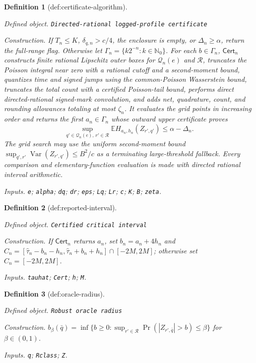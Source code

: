 \documentclass{article}
\newtheorem{definition}{Definition}
\begin{document}
\begin{definition}[def:certificate-algorithm]\label{def:certificate-algorithm}
\par\smallskip\noindent\emph{Defined object.} \texttt{Directed-\allowbreak{}rational logged-\allowbreak{}profile certificate}
\par\smallskip\noindent\emph{Construction.} If \(T_n\leq K\), \(\delta_{q,n}>c/4\), the enclosure is empty, or
\(\Delta_n\geq\alpha\), return the full-range flag.  Otherwise let
\(\Gamma_n=\{k2^{-n}:k\in\mathbb N_0\}\).
For each \(b\in\Gamma_n\), \(\mathsf{Cert}_n\) constructs finite rational
Lipschitz outer boxes for \(\mathcal Q_n(e)\) and \(\mathcal R\), truncates the
Poisson integral near zero with a rational cutoff and a second-moment bound,
quantizes time and signed jumps using the common-Poisson Wasserstein bound,
truncates the total count with a certified Poisson-tail bound, performs direct
directed-rational signed-mark convolution, and adds net, quadrature, count, and
rounding allowances totaling at most \(\zeta_n\).  It evaluates the grid points
in increasing order and returns the first \(a_n\in\Gamma_n\) whose outward
upper certificate proves
\[
\sup_{q'\in\mathcal Q_n(e),\,r'\in\mathcal R}
\mathbb E H_{a_n,h_n}(Z_{r',q'})\leq\alpha-\Delta_n.
\]
The grid search may use the uniform second-moment bound
\(\sup_{q',r'}\operatorname{Var}(Z_{r',q'})\leq B^2/c\) as a terminating
large-threshold fallback.  Every comparison and elementary-function
evaluation is made with directed rational interval arithmetic.
\par\smallskip\noindent\emph{Inputs.} \texttt{e}; \texttt{alpha}; \texttt{dq}; \texttt{dr}; \texttt{eps}; \texttt{Lq}; \texttt{Lr}; \texttt{c}; \texttt{K}; \texttt{B}; \texttt{zeta}.
\end{definition}

\begin{definition}[def:reported-interval]\label{def:reported-interval}
\par\smallskip\noindent\emph{Defined object.} \texttt{Certified critical interval}
\par\smallskip\noindent\emph{Construction.} If \(\mathsf{Cert}_n\) returns \(a_n\), set \(b_n=a_n+4h_n\) and \(C_n=[\widehat\tau_n-b_n-h_n,\widehat\tau_n+b_n+h_n]\cap[-2M,2M]\); otherwise set \(C_n=[-2M,2M]\).
\par\smallskip\noindent\emph{Inputs.} \texttt{tauhat}; \texttt{Cert}; \texttt{h}; \texttt{M}.
\end{definition}

\begin{definition}[def:oracle-radius]\label{def:oracle-radius}
\par\smallskip\noindent\emph{Defined object.} \texttt{Robust oracle radius}
\par\smallskip\noindent\emph{Construction.} \(b_{\beta}(\bar q)=\inf\{b\ge0:\sup_{r'\in\mathcal R}\Pr(|Z_{r',\bar q}|>b)\le\beta\}\) for \(\beta\in(0,1)\).
\par\smallskip\noindent\emph{Inputs.} \texttt{q}; \texttt{Rclass}; \texttt{Z}.
\end{definition}
\end{document}
